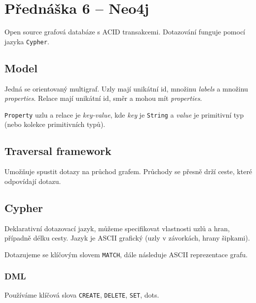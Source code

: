 \section{Přednáška 6 -- Neo4j}

Open source grafová databáze s ACID transakcemi.
Dotazování funguje pomocí jazyka \texttt{Cypher}.

\subsection*{Model}

Jedná se orientovaný multigraf.
Uzly mají unikátní id, množinu \textit{labels} a množinu \textit{properties}.
Relace mají unikátní id, směr a mohou mít \textit{properties}.

\texttt{Property} uzlu a relace je \textit{key-value}, kde \textit{key} je \texttt{String} a \textit{value} je primitivní typ (nebo kolekce primitivních typů).

\subsection*{Traversal framework}

Umožňuje spustit dotazy na průchod grafem.
Průchody se přesně drží ceste, které odpovídají dotazu.

\subsection*{Cypher}

Deklarativní dotazovací jazyk, můžeme specifikovat vlastnosti uzlů a hran, případně délku cesty.
Jazyk je ASCII grafický (uzly v závorkách, hrany šipkami).

Dotazujeme se klíčovým slovem \texttt{MATCH}, dále následuje ASCII reprezentace grafu.

\subsubsection*{DML}

Používáme klíčová slova \texttt{CREATE}, \texttt{DELETE}, \texttt{SET}, dots.
